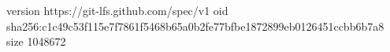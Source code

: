 version https://git-lfs.github.com/spec/v1
oid sha256:c1c49c53f115e7f7861f5468b65a0b2fe77bfbe1872899eb0126451ccbb6b7a8
size 1048672
